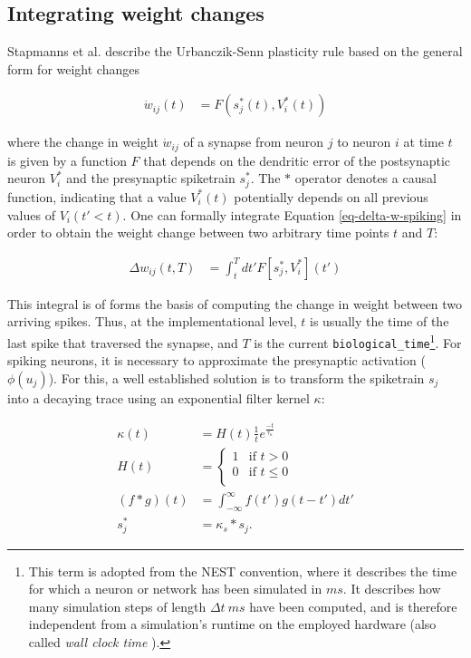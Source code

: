 \subsection{Integrating weight changes}


Stapmanns et al. describe the Urbanczik-Senn plasticity rule based on the general form for weight changes

\begin{align}
  \dot{w}_{ij}(t) & = F(s_j^\ast (t), V_i^\ast (t)) \label{eq-delta-w-spiking}
\end{align}

where the change in weight $\dot{w}_{ij}$ of a synapse from neuron $j$ to neuron $i$ at time $t$ is given by a function
$F$ that depends on the dendritic error of the postsynaptic neuron $V_i^\ast$ and the presynaptic spiketrain $s_j^\ast$.
The $\ast$ operator denotes a causal function, indicating that a value $V_i^\ast(t)$ potentially depends on all previous
values of $V_i(t' < t)$. One can formally integrate Equation \ref{eq-delta-w-spiking} in order to obtain the weight
change between two arbitrary time points $t$ and $T$:

\begin{align}
  \Delta w_{ij}(t,T) & = \int_t^T dt' F[s_j^\ast, V_i^\ast](t') \label{eq-delta-w-t-T}
\end{align}

This integral is of forms the basis of computing the change in weight between two arriving spikes. Thus, at the
implementational level, $t$ is usually the time of the last spike that traversed the synapse, and $T$ is the current
\texttt{biological\_time}\footnote{This term is adopted from the NEST convention, where it describes the time for which
a neuron or network has been simulated in $ms$. It describes how many simulation steps of length $\Delta t \ ms$ have
been computed, and is therefore independent from a simulation's runtime  on the employed hardware (also called
\textit{wall clock time} \citep{albada2018performance}). }. For spiking neurons, it is necessary to approximate the
presynaptic activation ($\phi(u_j)$). For this, a well established solution is to transform the spiketrain $s_j$ into a
decaying trace using an exponential filter kernel $\kappa$:

\begin{align}
  \kappa(t)     & = H(t) \frac{1}{t}e^{\frac{-t}{\tau_{\kappa}}}                        \\
  H(t)          & =
  \begin{cases}
    1 & \text{if $t > 0$}    \\
    0 & \text{if $t \leq 0$} \\
  \end{cases}                                                              \\
  (f \ast g)(t) & = \int_{- \infty }^{\infty} f(t') g(t-t') d t' \label{eq-convolution} \\
  s_j^\ast      & = \kappa_s \ast s_j. \label{eq-spike-trace}
\end{align}

